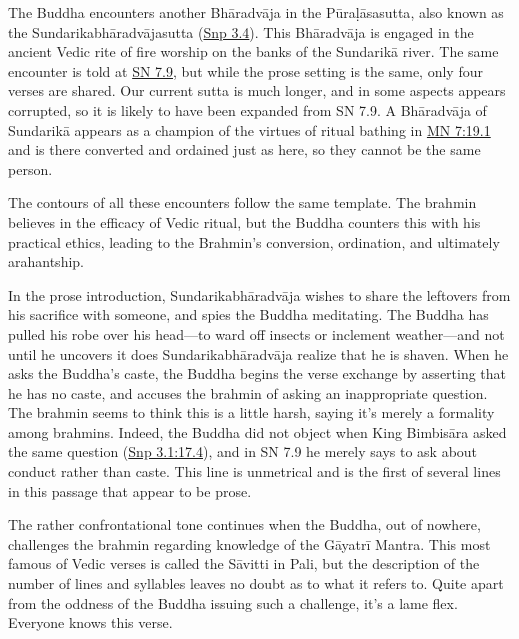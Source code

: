 \documentclass[12pt,openany]{book}%
\begin{document}
The Buddha encounters another \textsanskrit{Bhāradvāja} in the \textsanskrit{Pūraḷāsasutta}, also known as the \textsanskrit{Sundarikabhāradvājasutta} (\href{https://suttacentral.net/snp3.4/en/sujato}{Snp 3.4}). This \textsanskrit{Bhāradvāja} is engaged in the ancient Vedic rite of fire worship on the banks of the \textsanskrit{Sundarikā} river. The same encounter is told at \href{https://suttacentral.net/sn7.9/en/sujato}{SN 7.9}, but while the prose setting is the same, only four verses are shared. Our current sutta is much longer, and in some aspects appears corrupted, so it is likely to have been expanded from SN 7.9. A \textsanskrit{Bhāradvāja} of \textsanskrit{Sundarikā} appears as a champion of the virtues of ritual bathing in \href{https://suttacentral.net/mn7/en/sujato\#19.1}{MN 7:19.1} and is there converted and ordained just as here, so they cannot be the same person.

The contours of all these encounters follow the same template. The brahmin believes in the efficacy of Vedic ritual, but the Buddha counters this with his practical ethics, leading to the Brahmin’s conversion, ordination, and ultimately arahantship.

In the prose introduction, \textsanskrit{Sundarikabhāradvāja} wishes to share the leftovers from his sacrifice with someone, and spies the Buddha meditating. The Buddha has pulled his robe over his head—to ward off insects or inclement weather—and not until he uncovers it does \textsanskrit{Sundarikabhāradvāja} realize that he is shaven. When he asks the Buddha’s caste, the Buddha begins the verse exchange by asserting that he has no caste, and accuses the brahmin of asking an inappropriate question. The brahmin seems to think this is a little harsh, saying it’s merely a formality among brahmins. Indeed, the Buddha did not object when King \textsanskrit{Bimbisāra} asked the same question (\href{https://suttacentral.net/snp3.1/en/sujato\#17.4}{Snp 3.1:17.4}), and in SN 7.9 he merely says to ask about conduct rather than caste. This line is unmetrical and is the first of several lines in this passage that appear to be prose.

The rather confrontational tone continues when the Buddha, out of nowhere, challenges the brahmin regarding knowledge of the \textsanskrit{Gāyatrī} Mantra. This most famous of Vedic verses is called the \textsanskrit{Sāvitti} in Pali, but the description of the number of lines and syllables leaves no doubt as to what it refers to. Quite apart from the oddness of the Buddha issuing such a challenge, it’s a lame flex. Everyone knows this verse.
\end{document}
